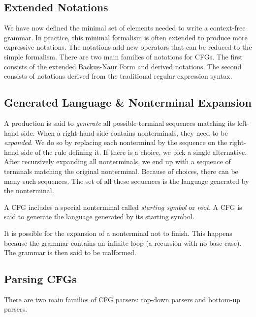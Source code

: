 \subsection{Extended Notations}

We have now defined the minimal set of elements needed to write a context-free
grammar. In practice, this minimal formalism is often extended to produce more
expressive notations. The notations add new operators that can be reduced to the
simple formalism. There are two main families of notations for CFGs. The first
consists of the extended Backus-Naur Form \cite{iso14977} and derived
notations. The second consists of notations derived from the traditional regular
expression syntax. \cite{iso9945}

\subsection{Generated Language \& Nonterminal Expansion}

A production is said to \emph{generate} all possible terminal sequences matching
its left-hand side. When a right-hand side contains nonterminals, they need to
be \emph{expanded}. We do so by replacing each nonterminal by the sequence on
the right-hand side of the rule defining it. If there is a choice, we pick a
single alternative. After recursively expanding all nonterminals, we end up with
a sequence of terminals matching the original nonterminal. Because of choices,
there can be many such sequences. The set of all these sequences is the language
generated by the nonterminal.

A CFG includes a special nonterminal called \emph{starting symbol} or
\emph{root}. A CFG is said to generate the language generated by its starting
symbol.

It is possible for the expansion of a nonterminal not to finish. This happens
because the grammar contains an infinite loop (a recursion with no base
case). The grammar is then said to be malformed.

\subsection{Parsing CFGs}
\label{cfg_parsing}

There are two main families of CFG parsers: top-down parsers and bottom-up
parsers.

